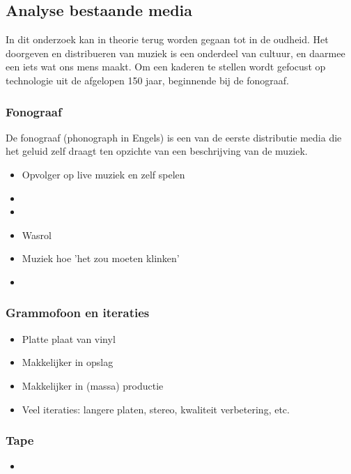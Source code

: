 \subsection{Analyse bestaande media}
In dit onderzoek kan in theorie terug worden gegaan tot in de oudheid. Het doorgeven en distribueren van muziek is een onderdeel van cultuur, en daarmee een iets wat ons mens maakt. Om een kaderen te stellen wordt gefocust op technologie uit de afgelopen 150 jaar, beginnende bij de fonograaf.

\subsubsection*{Fonograaf}
De fonograaf (phonograph in Engels) is een van de eerste distributie media die het geluid zelf draagt ten opzichte van een beschrijving van de muziek. 

\begin{itemize}
    \item Opvolger op live muziek en zelf spelen
    \item {}
    \item {}
    \item Wasrol
    \item Muziek hoe 'het zou moeten klinken'
    \item 
\end{itemize}

\subsubsection*{Grammofoon en iteraties}
\begin{itemize}
    \item Platte plaat van vinyl
    \item Makkelijker in opslag
    \item Makkelijker in (massa) productie
    \item Veel iteraties: langere platen, stereo, kwaliteit verbetering, etc.
\end{itemize}

\subsubsection*{Tape}
\begin{itemize}
    \item 
\end{itemize}

